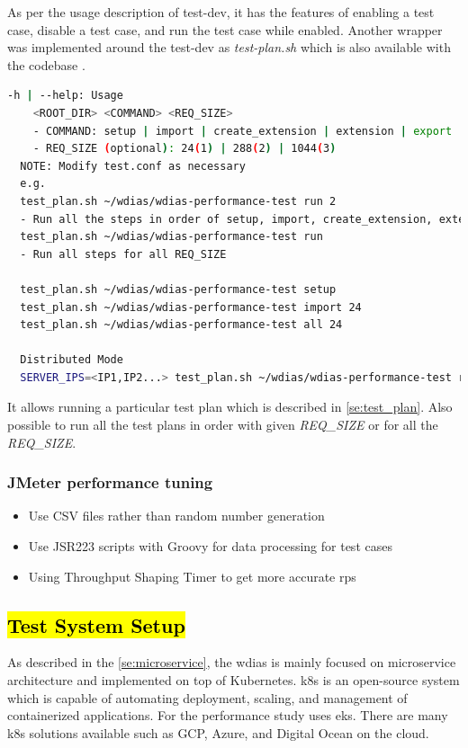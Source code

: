 As per the usage description of test-dev, it has the features of enabling a test case, disable a test case, and run the test case while enabled.
Another wrapper was implemented around the test-dev as \emph{test-plan.sh} which is also available with the codebase \cite{KarunarathneWdias-performance-test/TEST_PLAN.md:Plan}.

\begin{lstlisting}[language=sh, caption=Test Plan Help]
-h | --help: Usage
    <ROOT_DIR> <COMMAND> <REQ_SIZE>
    - COMMAND: setup | import | create_extension | extension | export | all | query
    - REQ_SIZE (optional): 24(1) | 288(2) | 1044(3)
  NOTE: Modify test.conf as necessary
  e.g.
  test_plan.sh ~/wdias/wdias-performance-test run 2
  - Run all the steps in order of setup, import, create_extension, extension, export, all, query
  test_plan.sh ~/wdias/wdias-performance-test run
  - Run all steps for all REQ_SIZE

  test_plan.sh ~/wdias/wdias-performance-test setup
  test_plan.sh ~/wdias/wdias-performance-test import 24
  test_plan.sh ~/wdias/wdias-performance-test all 24

  Distributed Mode
  SERVER_IPS=<IP1,IP2...> test_plan.sh ~/wdias/wdias-performance-test run
\end{lstlisting}

It allows running a particular test plan which is described in \cref{se:test_plan}. Also possible to run all the test plans in order with given \emph{REQ\_SIZE} or for all the \emph{REQ\_SIZE}.

\subsubsection{JMeter performance tuning}
\begin{itemize}
    \item Use CSV files rather than random number generation
    \item Use JSR223 scripts with Groovy for data processing for test cases
    \item Using Throughput Shaping Timer to get more accurate \acrshort{rps}
\end{itemize}


\subsection{\hl{Test System Setup}}
\label{subse:test_sys_config}
As described in the \cref{se:microservice}, the \acrshort{wdias} is mainly focused on microservice architecture and implemented on top of Kubernetes. \acrfull{k8s} is an open-source system which is capable of automating deployment, scaling, and management of containerized applications. For the performance study uses \acrfull{eks}. There are many \acrshort{k8s} solutions available such as GCP, Azure, and Digital Ocean on the cloud.

